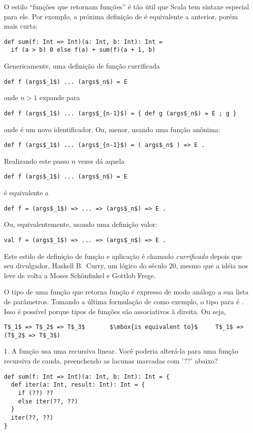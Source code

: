 O estilo ``fun\c{c}\~{o}es que retornam fun\c{c}\~{o}es'' \'{e} t\~{a}o \'{u}til que Scala tem sintaxe
especial para ele. Por exemplo, a pr\'{o}xima defini\c{c}\~{a}o de  \'{e} equivalente
a anterior, por\'{e}m mais curta: 
\begin{lstlisting}
def sum(f: Int => Int)(a: Int, b: Int): Int =
  if (a > b) 0 else f(a) + sum(f)(a + 1, b)
\end{lstlisting}

Genericamente, uma defini\c{c}\~{a}o de fun\c{c}\~{a}o currificada
\begin{lstlisting}
def f (args$_1$) ... (args$_n$) = E
\end{lstlisting}

onde $n > 1$ expande para 
\begin{lstlisting}
def f (args$_1$) ... (args$_{n-1}$) = { def g (args$_n$) = E ; g }
\end{lstlisting}
onde  \'{e} um novo identificador. Ou, menor, usando uma fun\c{c}\~{a}o an\^{o}nima: 
\begin{lstlisting}
def f (args$_1$) ... (args$_{n-1}$) = ( args$_n$ ) => E .
\end{lstlisting}
Realizando este passo $n$ vezes d\'{a} aquela 
\begin{lstlisting}
def f (args$_1$) ... (args$_n$) = E
\end{lstlisting}
\'{e} equivalente a 
\begin{lstlisting}
def f = (args$_1$) => ... => (args$_n$) => E .
\end{lstlisting}
Ou, equivalentemente, usando uma defini\c{c}\~{a}o valor:
\begin{lstlisting}
val f = (args$_1$) => ... => (args$_n$) => E .
\end{lstlisting}
Este estilo de defini\c{c}\~{a}o de fun\c{c}\~{a}o e aplica\c{c}\~{a}o \'{e} chamado {\em currificado}
depois que seu divulgador, Haskell B.\ Curry, um l\'{o}gico do s\'{e}culo $20$, mesmo 
que a id\'{e}ia nos leve de volta a Moses Sch\"onfinkel e Gottlob Frege.

O tipo de uma fun\c{c}\~{a}o que retorna fun\c{c}\~{a}o \'{e} expresso de modo an\'{a}logo a sua lista
de par\^{a}metros. Tomando a \'{u}ltima formula\c{c}\~{a}o de  como exemplo, o tipo 
para  \'{e} .
Isso \'{e} poss\'{i}vel porque tipos de fun\c{c}\~{o}es s\~{a}o associativos à direita. Ou seja, 
\begin{lstlisting}
T$_1$ => T$_2$ => T$_3$       $\mbox{is equivalent to}$     T$_1$ => (T$_2$ => T$_3$)
\end{lstlisting}
\begin{exercise}
1. A fun\c{c}\~{a}o  usa uma recursiva linear. Voc\^{e} poderia alter\'{a}-la
para uma fun\c{c}\~{a}o recursiva de cauda, preenchendo as lacunas marcadas com '??' abaixo?  
\begin{lstlisting}
def sum(f: Int => Int)(a: Int, b: Int): Int = {
  def iter(a: Int, result: Int): Int = {
    if (??) ??
    else iter(??, ??)
  }
  iter(??, ??)
}
\end{lstlisting}
\end{exercise}

